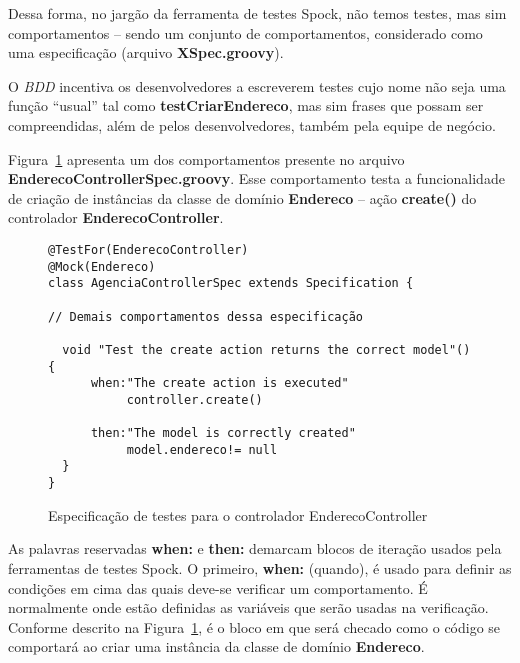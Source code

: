 \vspace{0.2cm}

Dessa forma, no jargão da ferramenta  de testes Spock, não temos testes, mas sim
comportamentos  -- sendo  um conjunto  de comportamentos,  considerado  como uma
especificação (arquivo {\bf XSpec.groovy}).  

\vspace{0.2cm}

O {\it BDD} incentiva os desenvolvedores  a escreverem testes cujo nome não seja
uma função ``usual'' tal como {\bf testCriarEndereco}, mas sim frases que possam
ser  compreendidas,  além  de  pelos  desenvolvedores,  também  pela  equipe  de
negócio.  

\vspace{0.2cm}

Figura~\ref{EndBehaFig} apresenta um dos comportamentos presente no arquivo {\bf
  EnderecoControllerSpec.groovy}.  Esse comportamento  testa a funcionalidade de
criação de instâncias da classe de domínio {\bf Endereco} -- ação {\bf create()}
do controlador {\bf EnderecoController}.  

\vspace{0.2cm}

\begin{figure}[htbp]
\begin{mdframed}
\begin{footnotesize}
\begin{verbatim}
@TestFor(EnderecoController)
@Mock(Endereco)
class AgenciaControllerSpec extends Specification {

// Demais comportamentos dessa especificação

  void "Test the create action returns the correct model"() {
      when:"The create action is executed"
           controller.create()

      then:"The model is correctly created"
           model.endereco!= null
  }
}
\end{verbatim}
\end{footnotesize}
\end{mdframed}
\caption{Especificação de testes para o controlador EnderecoController}
\label{EndBehaFig}
\end{figure}

As palavras  reservadas {\bf  when:} e {\bf  then:} demarcam blocos  de iteração
usados pela  ferramentas de  testes Spock. O  primeiro, {\bf when:}  (quando), é
usado  para  definir  as  condições  em  cima das  quais  deve-se  verificar  um
comportamento. É normalmente onde estão  definidas as variáveis que serão usadas
na verificação. Conforme  descrito na Figura~\ref{EndBehaFig}, é o  bloco em que
será checado  como o código  se comportará ao  criar uma instância da  classe de
domínio {\bf Endereco}.  

